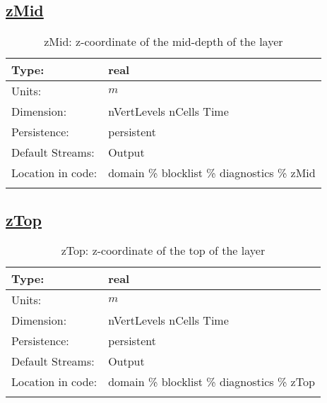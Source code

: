 \subsection[zMid]{\hyperref[sec:var_tab_diagnostics]{zMid}}
\label{subsec:var_sec_diagnostics_zMid}
\begin{center}
\begin{longtable}{| p{2.0in} | p{4.0in} |}
        \hline 
        Type: & real \\
        \hline 
        Units: & $m$ \\
        \hline 
        Dimension: & nVertLevels nCells Time \\
        \hline 
        Persistence: & persistent \\
        \hline 
		 Default Streams: & Output  \\
        \hline 
		 Location in code: & domain \% blocklist \% diagnostics \% zMid \\
		 \hline 
    \caption{zMid: z-coordinate of the mid-depth of the layer}
\end{longtable}
\end{center}
\subsection[zTop]{\hyperref[sec:var_tab_diagnostics]{zTop}}
\label{subsec:var_sec_diagnostics_zTop}
\begin{center}
\begin{longtable}{| p{2.0in} | p{4.0in} |}
        \hline 
        Type: & real \\
        \hline 
        Units: & $m$ \\
        \hline 
        Dimension: & nVertLevels nCells Time \\
        \hline 
        Persistence: & persistent \\
        \hline 
		 Default Streams: & Output  \\
        \hline 
		 Location in code: & domain \% blocklist \% diagnostics \% zTop \\
		 \hline 
    \caption{zTop: z-coordinate of the top of the layer}
\end{longtable}
\end{center}
